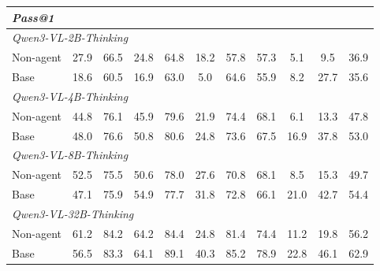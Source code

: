\begin{table}[t]
{\begin{tabular}{l ccc cccc cc >{\columncolor{mygray}}c}
        \multicolumn{11}{l}{\textit{Pass@1}} \\
        \midrule
        \multicolumn{11}{l}{\textit{Qwen3-VL-2B-Thinking}} \\
        Non-agent
            & 27.9 & 66.5 & 24.8 & 64.8 & 18.2 & 57.8 & 57.3 & 5.1 & 9.5 & 36.9 \\
        Base
            & 18.6 & 60.5 & 16.9 & 63.0 & 5.0 & 64.6 & 55.9 & 8.2 & 27.7 & 35.6 \\
        \midrule
        \multicolumn{11}{l}{\textit{Qwen3-VL-4B-Thinking}} \\
        Non-agent
            & 44.8 & 76.1 & 45.9 & 79.6 & 21.9 & 74.4 & 68.1 & 6.1 & 13.3 & 47.8 \\
        Base
            & 48.0 & 76.6 & 50.8 & 80.6 & 24.8 & 73.6 & 67.5 & 16.9 & 37.8 & 53.0 \\
        \midrule
        \multicolumn{11}{l}{\textit{Qwen3-VL-8B-Thinking}} \\
        Non-agent
            & 52.5 & 75.5 & 50.6 & 78.0 & 27.6 & 70.8 & 68.1 & 8.5 & 15.3 & 49.7 \\
        Base
            & 47.1 & 75.9 & 54.9 & 77.7 & 31.8 & 72.8 & 66.1 & 21.0 & 42.7 & 54.4 \\
        \midrule
        \multicolumn{11}{l}{\textit{Qwen3-VL-32B-Thinking}} \\
        Non-agent
            & 61.2 & 84.2 & 64.2 & 84.4 & 24.8 & 81.4 & 74.4 & 11.2 & 19.8 & 56.2 \\
        Base
            & 56.5 & 83.3 & 64.1 & 89.1 & 40.3 & 85.2 & 78.9 & 22.8 & 46.1 & 62.9 \\
        \midrule


\end{tabular}}
\end{table}
